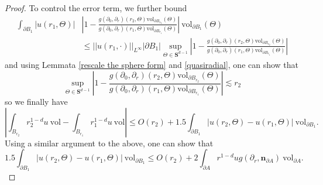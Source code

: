 \documentclass[reqno,12pt,letterpaper]{amsart}
\newcommand{\Sph}{\mathbf S}
\newcommand{\normal}{\mathbf n}
\newcommand{\vol}{\mathrm{vol}}
\theoremstyle{definition}
\numberwithin{equation}{section}
\begin{document}
\begin{proof}
To control the error term, we further bound
\begin{align*}
\int_{\partial B_1} |u(r_1, \Theta)|
&\left|1 - \frac{g(\partial_0, \partial_r)(r_2, \Theta) \vol_{\partial B_{r_2}}(\Theta)}{g(\partial_0, \partial_r)(r_1, \Theta) \vol_{\partial B_{r_1}}(\Theta)}\right| ~\vol_{\partial B_1}(\Theta) \\
&\leq ||u(r_1, \cdot)||_{L^\infty} |\partial B_1| \sup_{\Theta \in \Sph^{d - 1}} \left|1 - \frac{g(\partial_0, \partial_r)(r_2, \Theta) \vol_{\partial B_{r_2}}(\Theta)}{g(\partial_0, \partial_r)(r_1, \Theta) \vol_{\partial B_{r_1}}(\Theta)}\right|
\end{align*}
and using Lemmata \ref{rescale the sphere form} and \ref{quasiradial}, one can show that
$$\sup_{\Theta \in \Sph^{d - 1}} \left|1 - \frac{g(\partial_0, \partial_r)(r_2, \Theta) \vol_{\partial B_{r_2}}(\Theta)}{g(\partial_0, \partial_r)(r_1, \Theta) \vol_{\partial B_{r_1}}(\Theta)}\right| \lesssim r_2$$
so we finally have
$$
|\int_{B_{r_2}} r_2^{1 - d}u ~\vol - \int_{B_{r_1}} r_1^{1 - d}u ~\vol|
\leq O(r_2) + 1.5 \int_{\partial B_1} |u(r_2, \Theta) - u(r_1, \Theta)| ~\vol_{\partial B_1}.$$
Using a similar argument to the above, one can show that
$$1.5 \int_{\partial B_1} |u(r_2, \Theta) - u(r_1, \Theta)| ~\vol_{\partial B_1} \leq O(r_2) + 2 \int_{\partial A} r^{1 - d} ug(\partial_r, \normal_{\partial A}) ~\vol_{\partial A}.$$


\end{proof}
\end{document}
